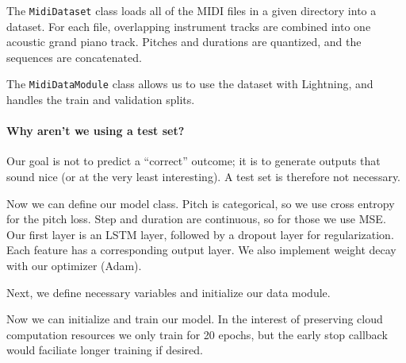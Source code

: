 \documentclass{article}
\begin{document}
The \lstinline{MidiDataset} class loads all of the MIDI files in a given directory into a dataset. For each file, overlapping instrument tracks are combined into one acoustic grand piano track. Pitches and durations are quantized, and the sequences are concatenated. 



The \lstinline{MidiDataModule} class allows us to use the dataset with Lightning, and handles the train and validation splits.

\paragraph{Why aren't we using a test set?} Our goal is not to predict a ``correct'' outcome; it is to generate outputs that sound nice (or at the very least interesting). A test set is therefore not necessary. 



Now we can define our model class. Pitch is categorical, so we use cross entropy for the pitch loss. Step and duration are continuous, so for those we  use MSE. Our first layer is an LSTM layer, followed by a dropout layer for regularization. Each feature has a corresponding output layer.  We also implement weight decay with our optimizer (Adam). 



Next, we define necessary variables and initialize our data module.



Now we can initialize and train our model. In the interest of preserving cloud computation resources we only train for 20 epochs, but the early stop callback would faciliate longer training if desired.


\end{document}
